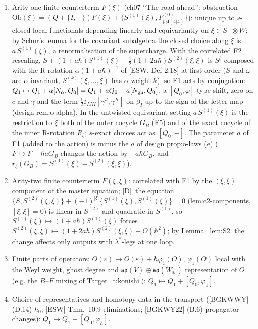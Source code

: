 \documentclass[11pt]{article}
\theoremstyle{definition}
\newcommand{\Dl}{\textup{[D]}}
\begin{document}
\begin{enumerate}
\item[F1.] Arity-one finite counterterm $F(\xi)$ (ch07 ``The road ahead'': obstruction $\mathrm{Ob}(\xi)=(Q+\{I,-\})F(\xi)+\{S^{(1)}(\xi),F^{(0)}_{\mathfrak{psl}(4|4)}\}$): unique up to $s$-closed local functionals depending linearly and equivariantly on $\xi\in S_+\otimes W$; by Schur's lemma for the covariant subalgebra the closed choice along $\xi$ is $a\,S^{(1)}(\xi)$, a renormalisation of the supercharge. With the correlated F2 rescaling, $S+(1+a\hbar)S^{(1)}(\xi)-\frac12(1+2a\hbar)S^{(2)}(\xi,\xi)$ is $S^\xi$ composed with the R-rotation $\alpha(1+a\hbar)^{-1}$ of [ESW, Def 2.18] at first order ($S$ and $\omega$ are $\alpha$-invariant, $S^{(k)}(\xi,\dots,\xi)$ has $\alpha$-weight $k$), so F1 acts by conjugation: $Q_1\mapsto Q_1+a[N_\alpha,Q_0]=Q_1+aQ_0-a[N_{\rm gh},Q_0]$, a $[Q_0,\varphi]$-type shift, zero on $c$ and $\gamma$ and the term $\frac12\varepsilon_{IJK}[\gamma^J,\gamma^K]$ on $\beta_I$ up to the sign of the letter map (design rem:o-alpha). In the untwisted equivariant setting $a\,S^{(1)}(\xi)$ is the restriction to $\xi$ both of the outer cocycle $G_B$ (F5) and of the exact cocycle of the inner R-rotation $R_\xi$; $s$-exact choices act as $[Q_0,-]$. The parameter $a$ of F1 (added to the action) is minus the $a$ of design prop:o-laws (e) ($F\mapsto F+\hbar aG_B$ changes the action by $-a\hbar G_B$, and $r_\xi(G_B)=S^{(1)}(\xi)-S^{(2)}(\xi,\xi)$).
\item[F2.] Arity-two finite counterterm $F(\xi,\xi)$: correlated with F1 by the $(\xi,\xi)$ component of the master equation; \Dl\ the equation $\{S,S^{(2)}(\xi,\xi)\}+(-1)^{|\xi|}\{S^{(1)}(\xi),S^{(1)}(\xi)\}=0$ (lem:c2-components, $[\xi,\xi]=0$) is linear in $S^{(2)}$ and quadratic in $S^{(1)}$, so $S^{(1)}(\xi)\mapsto(1+a\hbar)S^{(1)}(\xi)$ forces $S^{(2)}(\xi,\xi)\mapsto(1+2a\hbar)S^{(2)}(\xi,\xi)+O(\hbar^2)$; by Lemma~\ref{lem:S2} the change affects only outputs with $\lambda^*$-legs at one loop.
\item[F3.] Finite parts of operators: $O(\varepsilon)\mapsto O(\varepsilon)+\hbar\varphi_1(O)$, $\varphi_1(O)$ local with the Weyl weight, ghost degree and $\mathfrak{so}(V)\oplus\mathfrak{so}(W^\perp_{\mathbb R})$ representation of $O$ (e.g. the $B$--$F$ mixing of Target~\ref{t:konishi}): $Q_1\mapsto Q_1+[Q_0,\varphi_1]$.
\item[F4.] Choice of representatives and homotopy data in the transport ([BGKWWY] (D.14) $h_0$; [ESW] Thm.~10.9 eliminations; [BGKWY22] (B.6) propagator changes): $Q_1\mapsto Q_1+[Q_0,\varphi_h]$.

\end{enumerate}
\end{document}
